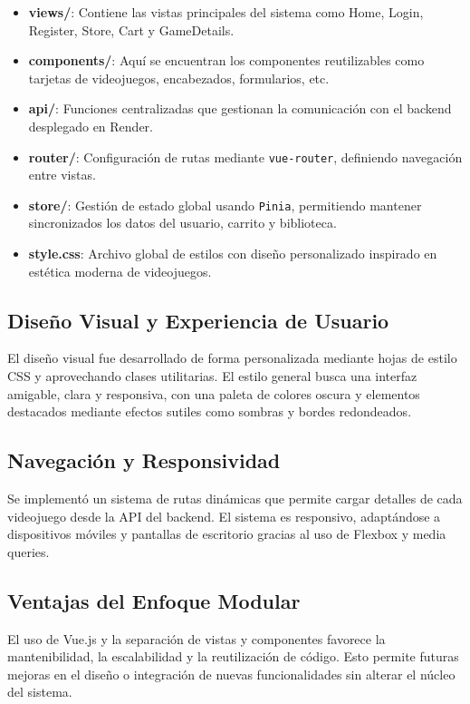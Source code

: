 \documentclass{article}
\begin{document}
\begin{itemize}
    \item \textbf{views/}: Contiene las vistas principales del sistema como Home, Login, Register, Store, Cart y GameDetails.
    \item \textbf{components/}: Aquí se encuentran los componentes reutilizables como tarjetas de videojuegos, encabezados, formularios, etc.
    \item \textbf{api/}: Funciones centralizadas que gestionan la comunicación con el backend desplegado en Render.
    \item \textbf{router/}: Configuración de rutas mediante \texttt{vue-router}, definiendo navegación entre vistas.
    \item \textbf{store/}: Gestión de estado global usando \texttt{Pinia}, permitiendo mantener sincronizados los datos del usuario, carrito y biblioteca.
    \item \textbf{style.css}: Archivo global de estilos con diseño personalizado inspirado en estética moderna de videojuegos.
\end{itemize}

\subsection{Diseño Visual y Experiencia de Usuario}

El diseño visual fue desarrollado de forma personalizada mediante hojas de estilo CSS y aprovechando clases utilitarias. El estilo general busca una interfaz amigable, clara y responsiva, con una paleta de colores oscura y elementos destacados mediante efectos sutiles como sombras y bordes redondeados.

\subsection{Navegación y Responsividad}

Se implementó un sistema de rutas dinámicas que permite cargar detalles de cada videojuego desde la API del backend. El sistema es responsivo, adaptándose a dispositivos móviles y pantallas de escritorio gracias al uso de Flexbox y media queries.

\subsection{Ventajas del Enfoque Modular}

El uso de Vue.js y la separación de vistas y componentes favorece la mantenibilidad, la escalabilidad y la reutilización de código. Esto permite futuras mejoras en el diseño o integración de nuevas funcionalidades sin alterar el núcleo del sistema.
\end{document}
